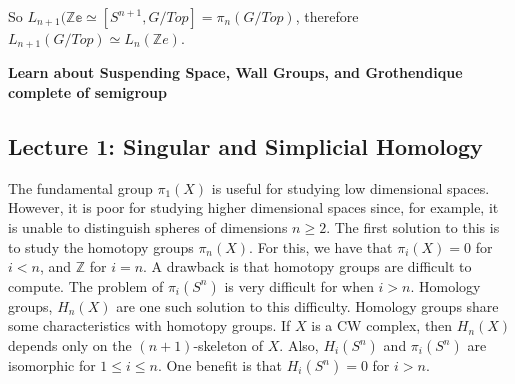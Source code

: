 \documentclass[crop=false,class=book,oneside]{standalone}
\begin{document}
        So $L_{n+1}(\mathbb{Ze}\simeq[S^{n+1},G/Top]%
            =\pi_{n}(G/Top)$,
        therefore $L_{n+1}(G/Top)\simeq{L_{n}(\mathbb{Z}e)}$.
        \par\hfill\par
        \textbf{Learn about Suspending Space, Wall Groups,
                and Grothendique complete of semigroup}
    \subsection{Lecture 1: Singular and Simplicial Homology}
            The fundamental group $\pi_{1}(X)$ is useful for
            studying low dimensional spaces. However, it is poor for
            studying higher dimensional spaces since, for example,
            it is unable to distinguish spheres of dimensions
            $n\geq 2$. The first solution to this is to study
            the homotopy groups $\pi_{n}(X)$. For this, we have
            that $\pi_{i}(X)=0$ for $i<n$, and $\mathbb{Z}$ for
            $i=n$. A drawback is that homotopy groups are
            difficult to compute. The problem of $\pi_{i}(S^{n})$
            is very difficult for when $i>n$. Homology groups,
            $H_{n}(X)$ are one such solution to this difficulty.
            Homology groups share some characteristics with
            homotopy groups. If $X$ is a CW complex, then $H_{n}(X)$
            depends only on the $(n+1)$-skeleton of $X$. Also,
            $H_{i}(S^{n})$ and $\pi_{i}(S^{n})$ are isomorphic for
            $1\leq i\leq n$. One benefit is that $H_{i}(S^{n})=0$
            for $i>n$.
\end{document}
